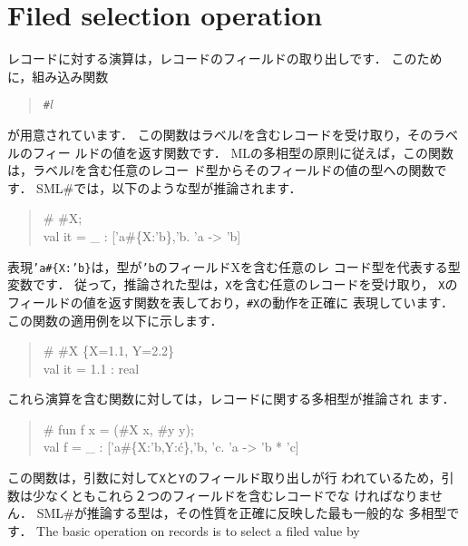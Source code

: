 \documentclass{jbook}
\newcommand{\txt}[2]{#2}
\newcommand{\smlsharp}{SML\#}
\begin{document}
\section{\txt{フィールド取り出し演算}{Filed selection operation}}
\label{sec:extensionFieldselection}

\ifx\jp%
	レコードに対する演算は，レコードのフィールドの取り出しです．
	このために，組み込み関数
\begin{tt}\begin{quote}
{\tt \#$l$}
\end{quote}\end{tt}
が用意されています．
	この関数はラベル$l$を含むレコードを受け取り，そのラベルのフィー
ルドの値を返す関数です．
	MLの多相型の原則に従えば，この関数は，ラベル$l$を含む任意のレコー
ド型からそのフィールドの値の型への関数です．
	\smlsharp{}では，以下のような型が推論されます．
\begin{tt}\begin{quote}
\# \#X;\\
val it = \_ : ['a\#\{X:'b\},'b. 'a -> 'b]
\end{quote}\end{tt}
	表現{\tt 'a\#\{X:'b\}}は，型が{\tt 'b}のフィールドXを含む任意のレ
コード型を代表する型変数です．
	従って，推論された型は，{\tt X}を含む任意のレコードを受け取り，
{\tt X}のフィールドの値を返す関数を表しており，{\tt \#X}の動作を正確に
表現しています．
	この関数の適用例を以下に示します．
\begin{tt}\begin{quote}
\# \#X \{X=1.1, Y=2.2\}\\
val it = 1.1 : real
\end{quote}\end{tt}
	これら演算を含む関数に対しては，レコードに関する多相型が推論され
ます．
\begin{tt}\begin{quote}
\# fun f x = (\#X x, \#y y);\\
val f = \_ : ['a\#\{X:'b,Y:\'c\},'b, 'c. 'a -> 'b * 'c]
\end{quote}\end{tt}
	この関数は，引数に対して{\tt X}と{\tt Y}のフィールド取り出しが行
われているため，引数は少なくともこれら２つのフィールドを含むレコードでな
ければなりません．
	\smlsharp{}が推論する型は，その性質を正確に反映した最も一般的な
多相型です．
\else%
	The basic operation on records is to select a filed value by
\end{document}
